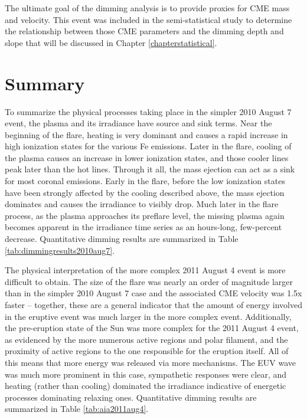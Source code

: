The ultimate goal of the dimming analysis is to provide proxies for CME mass and velocity. This event was included in the semi-statistical study to determine the relationship between those CME parameters and the dimming depth and slope that will be discussed in Chapter \ref{chapterstatistical}. 


\section{Summary}
To summarize the physical processes taking place in the simpler 2010 August 7 event, the plasma and its irradiance have source and sink terms. Near the beginning of the flare, heating is very dominant and causes a rapid increase in high ionization states for the various Fe emissions. Later in the flare, cooling of the plasma causes an increase in lower ionization states, and those cooler lines peak later than the hot lines. Through it all, the mass ejection can act as a sink for most coronal emissions. Early in the flare, before the low ionization states have been strongly affected by the cooling described above, the mass ejection dominates and causes the irradiance to visibly drop. Much later in the flare process, as the plasma approaches its preflare level, the missing plasma again becomes apparent in the irradiance time series as an hours-long, few-percent decrease. Quantitative dimming results are summarized in Table \ref{tab:dimmingresults2010aug7}. 

The physical interpretation of the more complex 2011 August 4 event is more difficult to obtain. The size of the flare was nearly an order of magnitude larger than in the simpler 2010 August 7 case and the associated CME velocity was 1.5x faster -- together, these are a general indicator that the amount of energy involved in the eruptive event was much larger in the more complex event. Additionally, the pre-eruption state of the Sun was more complex for the 2011 August 4 event, as evidenced by the more numerous active regions and polar filament, and the proximity of active regions to the one responsible for the eruption itself. All of this means that more energy was released via more mechanisms. The EUV wave was much more prominent in this case, sympathetic responses were clear, and heating (rather than cooling) dominated the irradiance indicative of energetic processes dominating relaxing ones. Quantitative dimming results are summarized in Table \ref{tab:aia2011aug4}. 